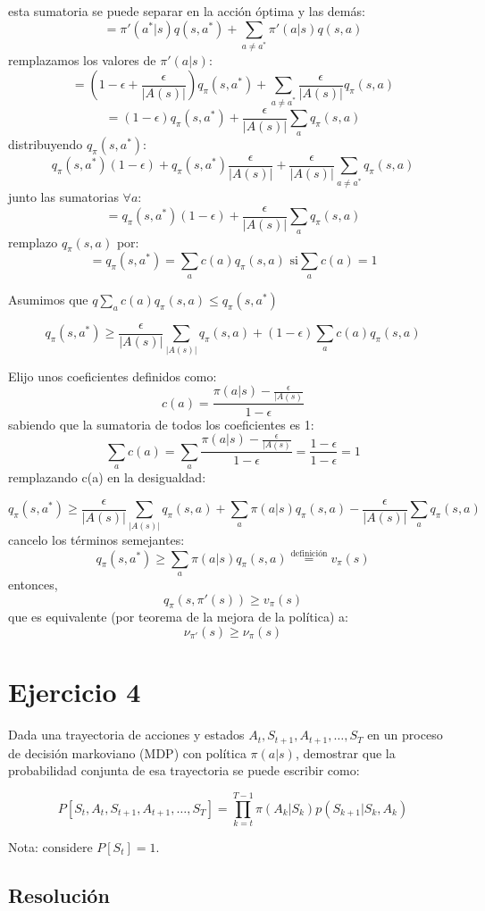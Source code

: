 \documentclass[12pt,a4paper]{article}
\begin{document}
esta sumatoria se puede separar en la acción óptima y las demás:
$$= \pi'(a^*|s)q(s,a^*) + \sum_{a\neq a^*} \pi'(a|s)q(s,a)$$
remplazamos los valores de $\pi'(a|s)$:
$$= (1-\epsilon + \frac{\epsilon}{|A(s)|})q_\pi(s,a^*) + \sum_{a\neq a^*} \frac{\epsilon}{|A(s)|}q_\pi(s,a)$$
$$= (1-\epsilon)q_\pi(s,a^*) + \frac{\epsilon}{|A(s)|} \sum_{a} q_\pi(s,a)$$
distribuyendo $q_\pi(s,a^*)$:
$$ q_\pi(s,a^*) (1-\epsilon) + q_\pi(s,a^*) \frac{\epsilon}{|A(s)|} + \frac{\epsilon}{|A(s)|} \sum_{a\neq a^*} q_\pi(s,a)$$
junto las sumatorias $\forall a$:
$$= q_\pi(s,a^*) (1-\epsilon) + \frac{\epsilon}{|A(s)|} \sum_{a} q_\pi(s,a)$$
remplazo $q_\pi(s,a)$ por:
$$= q_\pi(s,a^*) = \sum_a c(a) q_\pi(s,a) \text{ si} \sum_a c(a) = 1 $$

Asumimos que $q \sum_a c(a) q_\pi(s,a) \leq q_\pi(s,a^*)$

$$ q_\pi(s,a^*) \geq \frac{\epsilon}{|A(s)|}\sum_{|A(s)|}q_\pi(s,a)+(1-\epsilon)\sum_a c(a) q_\pi(s,a)$$

Elijo unos coeficientes definidos como:
$$ c(a) = \frac{\pi(a|s) - \frac{\epsilon}{|A(s)}}{1-\epsilon}$$
sabiendo que la sumatoria de todos los coeficientes es 1:
$$ \sum_a c(a) = \sum_a \frac{\pi(a|s) - \frac{\epsilon}{|A(s)}}{1-\epsilon} = \frac{1 - \epsilon}{1-\epsilon} = 1$$
remplazando c(a) en la desigualdad:

$$ q_\pi(s,a^*) \geq \frac{\epsilon}{|A(s)|}\sum_{|A(s)|}q_\pi(s,a)+\sum_a \pi(a|s)q_\pi(s,a) - \frac{\epsilon}{|A(s)|} \sum_a q_\pi(s,a)$$
cancelo los términos semejantes:
$$ q_\pi(s,a^*) \geq \sum_a \pi(a|s)q_\pi(s,a) \stackrel{\text{definición}}{=} v_\pi(s)$$
entonces,
$$ q_\pi(s,\pi'(s)) \geq v_\pi(s)$$
que es equivalente (por teorema de la mejora de la política) a:
$$ \nu_{\pi'}(s) \geq \nu_\pi(s)$$

\section{Ejercicio 4}

Dada una trayectoria de acciones y estados $A_t,S_{t+1},A_{t+1},\dots,S_T$ en un
proceso de decisión markoviano (MDP) con política $\pi(a|s)$, demostrar que la 
probabilidad conjunta de esa trayectoria se puede escribir como:

$$P[S_t,A_t,S_{t+1},A_{t+1},\dots,S_T] = \prod_{k=t}^{T-1} \pi(A_k|S_k)p(S_{k+1}|S_k,A_k)$$

Nota: considere $P[S_t]=1$.

\subsection{Resolución}
\end{document}
